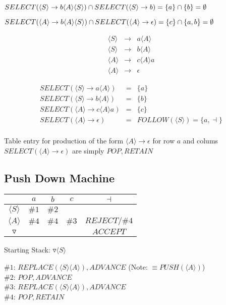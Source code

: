 \documentclass[a4paper,12pt]{article}
\newcommand{\nonterminal}[1]{\langle #1 \rangle}
\begin{document}
$SELECT(\nonterminal{S} \to b \nonterminal{A}\nonterminal{S}) \cap
SELECT(\nonterminal{S} \to b) \\ = \{a\} \cap \{b\} = \emptyset$

$SELECT(\nonterminal{A} \to b \nonterminal{A}\nonterminal{S}) \cap
SELECT(\nonterminal{A} \to \epsilon) \\ = \{c\} \cap \{a,b\} = \emptyset$


\begin{eqnarray*}
\nonterminal{S}	&	\to	&	a \nonterminal{A}				\\
\nonterminal{S}	&	\to	&	b \nonterminal{A}				\\
\nonterminal{A}	&	\to	&	c \nonterminal{A}	a			\\
\nonterminal{A}	&	\to	&	\epsilon							
\end{eqnarray*}

\begin{eqnarray*}
SELECT(\nonterminal{S}	\to	a \nonterminal{A}		) &	= 	&	\{a\}	\\
SELECT(\nonterminal{S}	\to	b \nonterminal{A}		) &	= 	&	\{b\}	\\
SELECT(\nonterminal{A}	\to	c \nonterminal{A}	a	) &	= 	&	\{c\}	\\
SELECT(\nonterminal{A}	\to	\epsilon					) &	= 	&
FOLLOW(\nonterminal{S}) = \{a,\dashv\}	\\
\end{eqnarray*}

Table entry for production of the form $\nonterminal{A} \to \epsilon$
for row $a$ and colums $SELECT(\nonterminal{A}	\to	\epsilon)$ are
simply $POP,RETAIN$

\subsection*{Push Down Machine}

\begin{tabular}{|c|c|c|c|c|}
\hline
						&	$a$	&	$b$	&	$c$	&	$\dashv$	\\
\hline
$\nonterminal{S}$	&	$\#1$	&	$\#2$	&			&				\\
\hline
$\nonterminal{A}$	&	$\#4$	&	$\#4$	&	$\#3$	&	$REJECT/\#4$	\\
\hline
$\triangledown$	&			&			&			&	$ACCEPT$	\\
\hline
\end{tabular}

Starting Stack: $\triangledown \nonterminal{S}$

$\#1$: $REPLACE(\nonterminal{S}\nonterminal{A}),ADVANCE$ (Note: $\equiv PUSH(\nonterminal{A})$)\\
$\#2$: $POP,ADVANCE$ \\
$\#3$: $REPLACE(\nonterminal{S}\nonterminal{A}),ADVANCE$ \\
$\#4$: $POP,RETAIN$ \\
\end{document}
